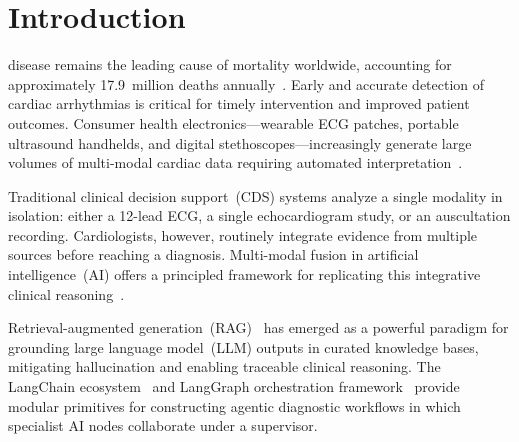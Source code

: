 \documentclass[journal,10pt,twoside]{IEEEtran}
\begin{document}
\section{Introduction}
\label{sec:intro}

 disease remains the leading cause of mortality
worldwide, accounting for approximately 17.9~million deaths annually~\cite{who2023}.
Early and accurate detection of cardiac arrhythmias is critical for timely
intervention and improved patient outcomes.
Consumer health electronics—wearable ECG patches, portable ultrasound handhelds,
and digital stethoscopes—increasingly generate large volumes of multi-modal cardiac
data requiring automated interpretation~\cite{steinhubl2013}.

Traditional clinical decision support~(CDS) systems analyze a single modality in
isolation: either a 12-lead ECG, a single echocardiogram study, or an auscultation
recording.
Cardiologists, however, routinely integrate evidence from multiple sources before
reaching a diagnosis.
Multi-modal fusion in artificial intelligence~(AI) offers a principled framework for
replicating this integrative clinical reasoning~\cite{ramachandram2017}.

Retrieval-augmented generation~(RAG)~\cite{lewis2020} has emerged as a powerful
paradigm for grounding large language model~(LLM) outputs in curated knowledge bases,
mitigating hallucination and enabling traceable clinical reasoning.
The LangChain ecosystem~\cite{langchain2022} and LangGraph orchestration
framework~\cite{langgraph2024} provide modular primitives for constructing agentic
diagnostic workflows in which specialist AI nodes collaborate under a supervisor.
\end{document}
